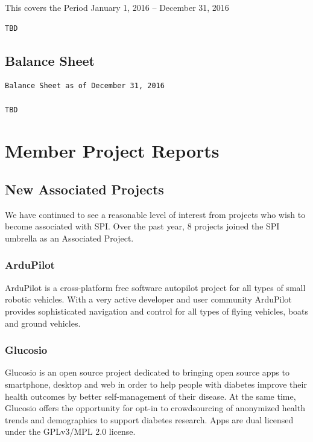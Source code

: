 \documentclass[letterpaper]{report}
\begin{document}
This covers the Period January 1, 2016 -- December 31, 2016

\begin{verbatim}
TBD
\end{verbatim}

\section{Balance Sheet}

\begin{verbatim}
Balance Sheet as of December 31, 2016

TBD
\end{verbatim}

\chapter{Member Project Reports}

\section{New Associated Projects}

We have continued to see a reasonable level of interest from projects
who wish to become associated with SPI. Over the past year, 8 projects
joined the SPI umbrella as an Associated Project.

\subsection{ArduPilot}

ArduPilot is a cross-platform free software autopilot project for all
types of small robotic vehicles. With a very active developer and user
community ArduPilot provides sophisticated navigation and control for
all types of flying vehicles, boats and ground vehicles.

\subsection{Glucosio}

Glucosio is an open source project dedicated to bringing open source
apps to smartphone, desktop and web in order to help people with
diabetes improve their health outcomes by better self-management of
their disease. At the same time, Glucosio offers the opportunity for
opt-in to crowdsourcing of anonymized health trends and demographics to
support diabetes research. Apps are dual licensed under the GPLv3/MPL
2.0 license.
\end{document}
